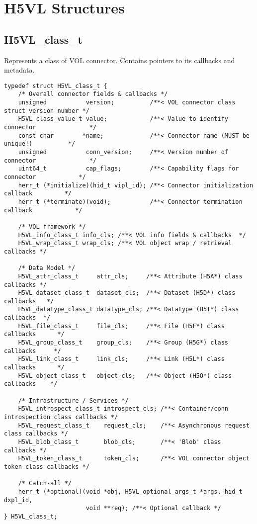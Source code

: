 \section{H5VL Structures}
\subsection{H5VL\_class\_t}

Represents a class of VOL connector. Contains pointers to its callbacks and metadata.

\begin{verbatim}
typedef struct H5VL_class_t {
    /* Overall connector fields & callbacks */
    unsigned           version;          /**< VOL connector class struct version number */
    H5VL_class_value_t value;            /**< Value to identify connector               */
    const char        *name;             /**< Connector name (MUST be unique!)          */
    unsigned           conn_version;     /**< Version number of connector               */
    uint64_t           cap_flags;        /**< Capability flags for connector            */
    herr_t (*initialize)(hid_t vipl_id); /**< Connector initialization callback         */
    herr_t (*terminate)(void);           /**< Connector termination callback            */

    /* VOL framework */
    H5VL_info_class_t info_cls; /**< VOL info fields & callbacks  */
    H5VL_wrap_class_t wrap_cls; /**< VOL object wrap / retrieval callbacks */

    /* Data Model */
    H5VL_attr_class_t     attr_cls;     /**< Attribute (H5A*) class callbacks */
    H5VL_dataset_class_t  dataset_cls;  /**< Dataset (H5D*) class callbacks   */
    H5VL_datatype_class_t datatype_cls; /**< Datatype (H5T*) class callbacks  */
    H5VL_file_class_t     file_cls;     /**< File (H5F*) class callbacks      */
    H5VL_group_class_t    group_cls;    /**< Group (H5G*) class callbacks     */
    H5VL_link_class_t     link_cls;     /**< Link (H5L*) class callbacks      */
    H5VL_object_class_t   object_cls;   /**< Object (H5O*) class callbacks    */

    /* Infrastructure / Services */
    H5VL_introspect_class_t introspect_cls; /**< Container/conn introspection class callbacks */
    H5VL_request_class_t    request_cls;    /**< Asynchronous request class callbacks */
    H5VL_blob_class_t       blob_cls;       /**< 'Blob' class callbacks */
    H5VL_token_class_t      token_cls;      /**< VOL connector object token class callbacks */

    /* Catch-all */
    herr_t (*optional)(void *obj, H5VL_optional_args_t *args, hid_t dxpl_id,
                       void **req); /**< Optional callback */
} H5VL_class_t;
\end{verbatim}

